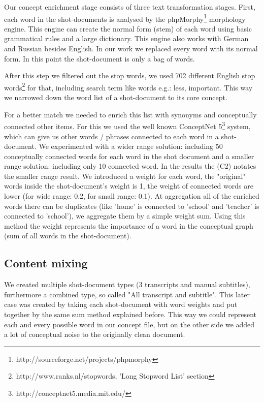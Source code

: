 \documentclass{acm_proc_article-me}
\begin{document}
Our concept enrichment stage consists of three text transformation stages. First, each word in the shot-documents is analysed by the phpMorphy\footnote{http://sourceforge.net/projects/phpmorphy} morphology engine. This engine can create the normal form (stem) of each word using basic grammatical rules and a large dictionary. This engine also works with German and Russian besides English. In our work we replaced every word with its normal form. In this point the shot-document is only a bag of words.

After this step we filtered out the stop words, we used 702 different English stop words\footnote{http://www.ranks.nl/stopwords, 'Long Stopword List' section} for that, including search term like words e.g.: less, important.
This way we narrowed down the word list of a shot-document to its core concept.

For a better match we needed to enrich this list with synonyms and conceptually connected other items. For this we used the well known ConceptNet 5\footnote{http://conceptnet5.media.mit.edu/} system, which can give us other words / phrases connected to each word in a shot-document. We experimented with a wider range solution: including 50 conceptually connected words for each word in the shot document and a smaller range solution: including only 10 connected word. In the results the (C2) notates the smaller range result. We introduced a weight for each word, the "original" words inside the shot-document's weight is 1, the weight of connected words are lower (for wide range: 0.2, for small range: 0.1). At aggregation all of the enriched words there can be duplicates (like 'home' is connected to 'school' and 'teacher' is connected to 'school'), we aggregate them by a simple weight sum. Using this method the weight represents the importance of a word in the conceptual graph (sum of all words in the shot-document).

\subsection{Content mixing}

We created multiple shot-document types (3 transcripts and manual subtitles), furthermore a combined type, so called "All transcript and subtitle". This later case was created by taking each shot-document with word weights and put together by the same sum method explained before. This way we could represent each and every possible word in our concept file, but on the other side we added a lot of conceptual noise to the originally clean document.
\end{document}
